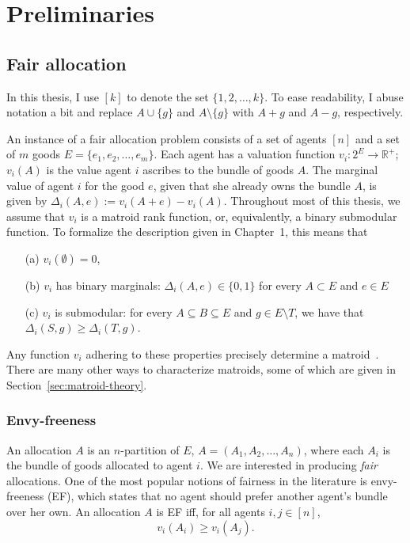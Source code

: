 \chapter{Preliminaries}


\section{Fair allocation}
In this thesis, I use $[k]$ to denote the set $\{1,2,\dots,k\}$. To ease readability, I abuse notation a bit and replace $A \cup \{g\}$ and $A \setminus \{g\}$ with $A+g$ and $A-g$, respectively.

An instance of a fair allocation problem consists of a set of agents $[n]$ and a set of $m$ goods $E = \{e_1, e_2, \dots, e_m\}$. Each agent has a valuation function $v_i: 2^E \to \mathbb{R}^+$; $v_i(A)$ is the value agent $i$ ascribes to the bundle of goods $A$. The marginal value of agent $i$ for the good $e$, given that she already owns the bundle $A$, is given by $\Delta_i(A, e) := v_i(A + e) - v_i(A)$. Throughout most of this thesis, we assume that $v_i$ is a matroid rank function, or, equivalently, a binary submodular function. To formalize the description given in Chapter~1, this means that
\begin{enumerate}
  \item[(a)] $v_i(\emptyset) = 0$,
  \item[(b)] $v_i$ has binary marginals: $\Delta_i(A, e)\in \{0,1\}$ for every $A \subset E$ and $e\in E$
  \item[(c)] $v_i$ is submodular: for every $A\subseteq B\subseteq E$ and $g\in E\setminus T$, we have that $\Delta_i(S, g) \geq \Delta_i(T, g)$.
\end{enumerate}
Any function $v_i$ adhering to these properties precisely determine a matroid~\cite{schrijver-2003}. There are many other ways to characterize matroids, some of which are given in Section~\ref{sec:matroid-theory}.

\subsection{Envy-freeness}
An allocation $A$ is an $n$-partition of $E$, $A = (A_1, A_2, \dots, A_n)$, where each $A_i$ is the bundle of goods allocated to agent $i$. We are interested in producing \textit{fair} allocations. One of the most popular notions of fairness in the literature is envy-freeness (EF), which states that no agent should prefer another agent's bundle over her own. An allocation $A$ is EF iff, for all agents $i,j\in [n]$,
\begin{equation} \tag{EF}
  v_i(A_i) \geq v_i(A_j).
\end{equation}

